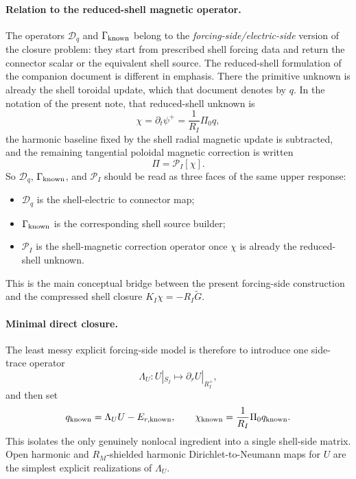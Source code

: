 \documentclass[11pt,a4paper]{article}
\begin{document}
\paragraph{Relation to the reduced-shell magnetic operator.}
The operators \(\mathcal D_q\) and \(\Gamma_{\rm known}\) belong to the
\emph{forcing-side/electric-side} version of the closure problem: they start
from prescribed shell forcing data and return the connector scalar or the
equivalent shell source. The reduced-shell formulation of the companion
document is different in emphasis. There the primitive unknown is already the
shell toroidal update, which that document denotes by \(q\). In the notation
of the present note, that reduced-shell unknown is
\[
\chi=\partial_t\psi^+ = \frac{1}{R_I}\Pi_0 q,
\]
the harmonic baseline fixed by the shell radial magnetic update is subtracted,
and the remaining tangential poloidal magnetic correction is written
\[
\Pi = \mathcal P_I[\chi].
\]
So \(\mathcal D_q\), \(\Gamma_{\rm known}\), and \(\mathcal P_I\) should be
read as three faces of the same upper response:
\begin{itemize}
\item \(\mathcal D_q\) is the shell-electric to connector map;
\item \(\Gamma_{\rm known}\) is the corresponding shell source builder;
\item \(\mathcal P_I\) is the shell-magnetic correction operator once
\(\chi\) is already the reduced-shell unknown.
\end{itemize}
This is the main conceptual bridge between the present forcing-side
construction and the compressed shell closure
\(K_I \chi = -R_I\widetilde G\).

\paragraph{Minimal direct closure.}
The least messy explicit forcing-side model is therefore to introduce one
side-trace operator
\[
\Lambda_U: U|_{S_I}\mapsto \partial_r U|_{R_I^+},
\]
and then set
\[
q_{\rm known} = \Lambda_U U - E_{r,\rm known},
\qquad
\chi_{\rm known}=\frac{1}{R_I}\Pi_0 q_{\rm known}.
\]
This isolates the only genuinely nonlocal ingredient into a single shell-side
matrix. Open harmonic and \(R_M\)-shielded harmonic Dirichlet-to-Neumann maps
for \(U\) are the simplest explicit realizations of \(\Lambda_U\).
\end{document}
